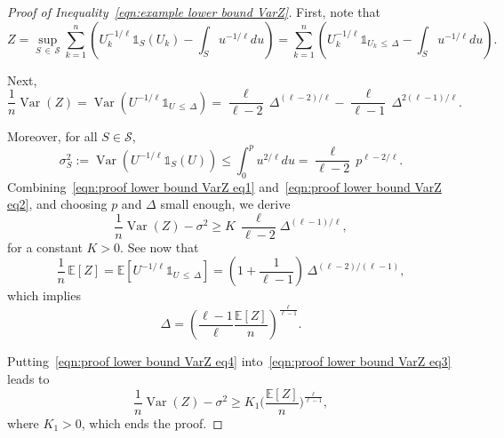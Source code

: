 \documentclass[AHL,Unicode,longabstracts,published]{cedram}
\DeclareMathOperator{\Var}{Var}
\newcommand{\bE}{\mathbb{E}}
\newcommand{\cS}{\mathcal{S}}
\newcommand{\ind}{\mathds{1}}
\begin{document}
\begin{proof}[Proof of Inequality~\eqref{eqn:example lower bound VarZ}]
First, note that
\[
Z=\sup_{S\,\in\,\cS}\sum_{k=1}^n\left(U_k^{-1/\ell}\ind_S(U_k)-\int_S u^{-1/\ell}du\right)=\sum_{k=1}^n\left(U_k^{-1/\ell}\ind_{U_k\,\leq\,\Delta}-\int_S u^{-1/\ell}du\right).
\]

Next,
\begin{equation}\label{eqn:proof lower bound VarZ eq1}
\frac 1n\Var(Z)=\Var\left(U^{-1/\ell}\ind_{U\,\leq\,\Delta}\right)=\frac{\ell}{\ell-2}\,\Delta^{(\ell-2)/\ell}-\frac{\ell}{\ell-1}\,\Delta^{2(\ell-1)/\ell}.
\end{equation}

Moreover, for all $S\in\cS$,
\begin{equation}\label{eqn:proof lower bound VarZ eq2}
\sigma_S^2 :=\Var\left(U^{-1/\ell}\ind_S(U)\right)\leq\int_0^p u^{2/\ell}du=\frac{\ell}{\ell-2}\,p^{\ell-2/\ell}.
\end{equation}
Combining~\eqref{eqn:proof lower bound VarZ eq1} and~\eqref{eqn:proof lower bound VarZ eq2}, and choosing $p$ and $\Delta$ small enough, we derive
\begin{equation}\label{eqn:proof lower bound VarZ eq3}
\frac 1n \Var(Z)-\sigma^2 \geq K\,\frac{\ell}{\ell-2}\Delta^{(\ell-1)/\ell},
\end{equation}
for a constant $K>0$. See now that
\begin{equation}
\frac 1n\,\bE[Z]=\bE\left[U^{-1/\ell}\ind_{U\,\leq\,\Delta}\right]=\left(1+\frac {1}{\ell-1}\right)\,\Delta^{(\ell-2)/(\ell-1)},
\end{equation}
which implies
\begin{equation}\label{eqn:proof lower bound VarZ eq4}
\Delta=\left(\frac{\ell-1}{\ell} \frac{\bE[Z]}{n}\right)^{\frac{\ell}{\ell-1}}.
\end{equation}

Putting~\eqref{eqn:proof lower bound VarZ eq4} into~\eqref{eqn:proof lower bound VarZ eq3} leads to
\begin{equation}
\frac 1n \Var(Z)-\sigma^2 \geq K_1\Big(\frac{\bE[Z]}{n}\Big)^{\frac{\ell}{\ell-1}},
\end{equation}
where $K_1>0$, which ends the proof.
\end{proof}
\end{document}
